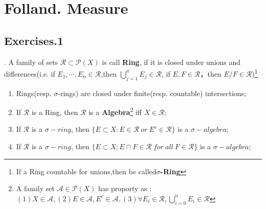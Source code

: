 \chapter{Folland. Measure}

\section{Exercises.1}

\begin{question}. A family of sets $\mathcal{R}\subset \mathcal{P}(X)$ is call \textbf{Ring}, if it is closed under unions and differences(i.e. if $E_1,\cdots,E_n\in \mathcal{R}$,then $\bigcup^n_{j=1}E_j\in \mathcal{R}$, if $E,F\in \mathcal{R}$，then $E/F\in \mathcal{R}$)\footnote{If a Ring countable for unions,then be called\textbf{$\sigma$-Ring}}
     \begin{enumerate}[itemindent=2em]
        \item Rings(resp. $\sigma$-rings) are closed under finite(resp. countable) intersections;
        \item If $\mathcal{R}$ is a Ring, then $\mathcal{R}$ is a \textbf{Algebra}\footnote{A family set $\mathcal{A}\in \mathcal{P}(X)$ has proporty as : $(1) X\in \mathcal{A},(2)E\in \mathcal{A},E^c\in \mathcal{A},(3) \forall E_i\in \mathcal{R},\bigcup^n_{i=0}E_i\in \mathcal{R}$ } iff $X\in \mathcal{R}$;
        \item If $\mathcal{R}$ is a $\sigma-ring$, then $\{E\subset X : E\in \mathcal{R}\ or\ E^c\in \mathcal{R}\}$ is a $\sigma-algebra$;
        \item If $\mathcal{R}$ is a $\sigma-ring$, then $\{E\subset X : E\cap F\in \mathcal{R}\ for\ all\ F\in \mathcal{R}\}$ is a $\sigma-algebra$;
     \end{enumerate}
\end{question}


